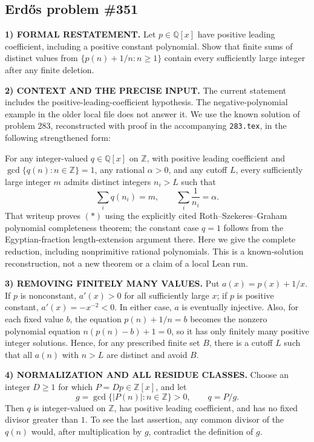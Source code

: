 \subsection*{Erd\H{o}s problem \#351}

\noindent\textbf{1) FORMAL RESTATEMENT.}
Let $p\in\mathbb Q[x]$ have positive leading coefficient, including a positive constant polynomial. Show that finite sums of distinct values from $\{p(n)+1/n:n\ge1\}$ contain every sufficiently large integer after any finite deletion.

\noindent\textbf{2) CONTEXT AND THE PRECISE INPUT.}
The current statement includes the positive-leading-coefficient hypothesis. The negative-polynomial example in the older local file does not answer it. We use the known solution of problem 283, reconstructed with proof in the accompanying \texttt{283.tex}, in the following strengthened form:

For any integer-valued $q\in\mathbb Q[x]$ on $\mathbb Z$, with positive leading coefficient and
$\gcd\{q(n):n\in\mathbb Z\}=1$, any rational $\alpha>0$, and any cutoff $L$, every sufficiently large integer $m$ admits distinct integers $n_i>L$ such that
\[
 \sum_i q(n_i)=m,\qquad \sum_i\frac1{n_i}=\alpha. \tag{*}
\]
That writeup proves $(*)$ using the explicitly cited Roth--Szekeres--Graham polynomial completeness theorem; the constant case $q=1$ follows from the Egyptian-fraction length-extension argument there. Here we give the complete reduction, including nonprimitive rational polynomials. This is a known-solution reconstruction, not a new theorem or a claim of a local Lean run.

\noindent\textbf{3) REMOVING FINITELY MANY VALUES.}
Put $a(x)=p(x)+1/x$. If $p$ is nonconstant, $a'(x)>0$ for all sufficiently large $x$; if $p$ is positive constant, $a'(x)=-x^{-2}<0$. In either case, $a$ is eventually injective. Also, for each fixed value $b$, the equation $p(n)+1/n=b$ becomes the nonzero polynomial equation $n(p(n)-b)+1=0$, so it has only finitely many positive integer solutions. Hence, for any prescribed finite set $B$, there is a cutoff $L$ such that all $a(n)$ with $n>L$ are distinct and avoid $B$.

\noindent\textbf{4) NORMALIZATION AND ALL RESIDUE CLASSES.}
Choose an integer $D\ge1$ for which $P=Dp\in\mathbb Z[x]$, and let
\[
 g=\gcd\{|P(n)|:n\in\mathbb Z\}>0,\qquad q=P/g.
\]
Then $q$ is integer-valued on $\mathbb Z$, has positive leading coefficient, and has no fixed divisor greater than $1$. To see the last assertion, any common divisor of the $q(n)$ would, after multiplication by $g$, contradict the definition of $g$.

